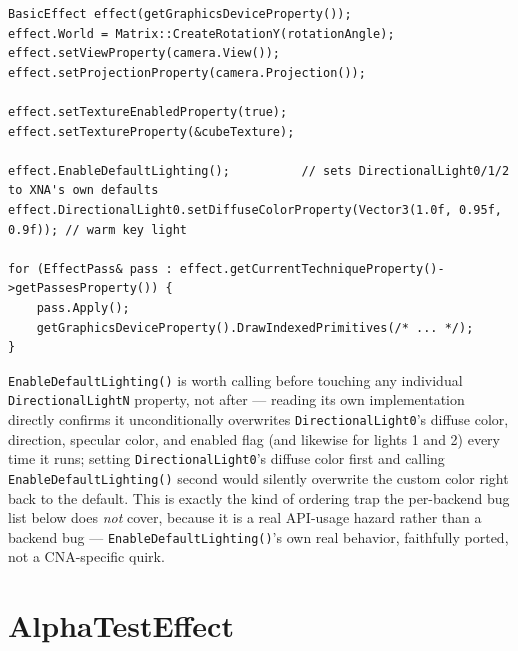 \begin{lstlisting}
BasicEffect effect(getGraphicsDeviceProperty());
effect.World = Matrix::CreateRotationY(rotationAngle);
effect.setViewProperty(camera.View());
effect.setProjectionProperty(camera.Projection());

effect.setTextureEnabledProperty(true);
effect.setTextureProperty(&cubeTexture);

effect.EnableDefaultLighting();          // sets DirectionalLight0/1/2 to XNA's own defaults
effect.DirectionalLight0.setDiffuseColorProperty(Vector3(1.0f, 0.95f, 0.9f)); // warm key light

for (EffectPass& pass : effect.getCurrentTechniqueProperty()->getPassesProperty()) {
    pass.Apply();
    getGraphicsDeviceProperty().DrawIndexedPrimitives(/* ... */);
}
\end{lstlisting}

\texttt{EnableDefaultLighting()} is worth calling before touching any individual
\texttt{DirectionalLightN} property, not after --- reading its own implementation directly
confirms it unconditionally overwrites \texttt{DirectionalLight0}'s diffuse color, direction,
specular color, and enabled flag (and likewise for lights 1 and 2) every time it runs; setting
\texttt{DirectionalLight0}'s diffuse color first and calling \texttt{EnableDefaultLighting()}
second would silently overwrite the custom color right back to the default. This is exactly the kind of ordering trap the per-backend bug list below
does \emph{not} cover, because it is a real API-usage hazard rather than a backend bug ---
\texttt{EnableDefaultLighting()}'s own real behavior, faithfully ported, not a CNA-specific
quirk.

\section{AlphaTestEffect}

